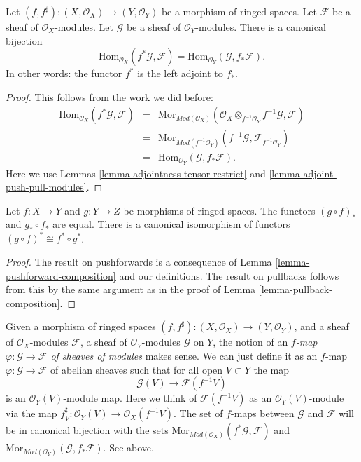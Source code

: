 \begin{lemma}
\label{lemma-adjoint-pullback-pushforward-modules}
Let $(f, f^\sharp) : (X, \mathcal{O}_X) \to (Y, \mathcal{O}_Y)$
be a morphism of ringed spaces.
Let $\mathcal{F}$ be a sheaf of $\mathcal{O}_X$-modules.
Let $\mathcal{G}$ be a sheaf of $\mathcal{O}_Y$-modules.
There is a canonical bijection
$$
\text{Hom}_{\mathcal{O}_X}(f^*\mathcal{G}, \mathcal{F})
=
\text{Hom}_{\mathcal{O}_Y}(\mathcal{G}, f_*\mathcal{F}).
$$
In other words: the functor $f^*$ is the left adjoint to
$f_*$.
\end{lemma}

\begin{proof}
This follows from the work we did before:
\begin{eqnarray*}
\text{Hom}_{\mathcal{O}_X}(f^*\mathcal{G}, \mathcal{F})
& = &
\text{Mor}_{\textit{Mod}(\mathcal{O}_X)}(
\mathcal{O}_X \otimes_{f^{-1}\mathcal{O}_Y} f^{-1}\mathcal{G}, \mathcal{F}) \\
& = &
\text{Mor}_{\textit{Mod}(f^{-1}\mathcal{O}_Y)}(
f^{-1}\mathcal{G}, \mathcal{F}_{f^{-1}\mathcal{O}_Y}) \\
& = &
\text{Hom}_{\mathcal{O}_Y}(\mathcal{G}, f_*\mathcal{F}).
\end{eqnarray*}
Here we use Lemmas \ref{lemma-adjointness-tensor-restrict}
and \ref{lemma-adjoint-push-pull-modules}.
\end{proof}

\begin{lemma}
\label{lemma-push-pull-composition-modules}
Let $f : X \to Y$ and $g : Y \to Z$ be morphisms of ringed spaces.
The functors $(g \circ f)_*$ and $g_* \circ f_*$ are equal.
There is a canonical isomorphism of functors
$(g \circ f)^* \cong f^* \circ g^*$.
\end{lemma}

\begin{proof}
The result on pushforwards is a consequence of Lemma
\ref{lemma-pushforward-composition} and our definitions.
The result on pullbacks follows from this by the same
argument as in the proof of Lemma \ref{lemma-pullback-composition}.
\end{proof}


\noindent
Given a morphism of ringed spaces
$(f, f^\sharp) : (X, \mathcal{O}_X) \to (Y, \mathcal{O}_Y)$,
and a sheaf of $\mathcal{O}_X$-modules $\mathcal{F}$,
a sheaf of $\mathcal{O}_Y$-modules $\mathcal{G}$ on $Y$,
the notion of an {\it $f$-map $\varphi : \mathcal{G} \to \mathcal{F}$
of sheaves of modules} makes sense. We can just define
it as an $f$-map $\varphi : \mathcal{G} \to \mathcal{F}$
of abelian sheaves such that for all open $V \subset Y$ the map
$$
\mathcal{G}(V) \longrightarrow \mathcal{F}(f^{-1}V)
$$
is an $\mathcal{O}_Y(V)$-module map. Here we think of
$\mathcal{F}(f^{-1}V)$ as an $\mathcal{O}_Y(V)$-module
via the map $f^\sharp_V : \mathcal{O}_Y(V) \to \mathcal{O}_X(f^{-1}V)$.
The set of $f$-maps between
$\mathcal{G}$ and $\mathcal{F}$ will be in canonical bijection
with the sets
$\text{Mor}_{\textit{Mod}(\mathcal{O}_X)}(f^*\mathcal{G}, \mathcal{F})$
and
$\text{Mor}_{\textit{Mod}(\mathcal{O}_Y)}(\mathcal{G}, f_*\mathcal{F})$.
See above.

